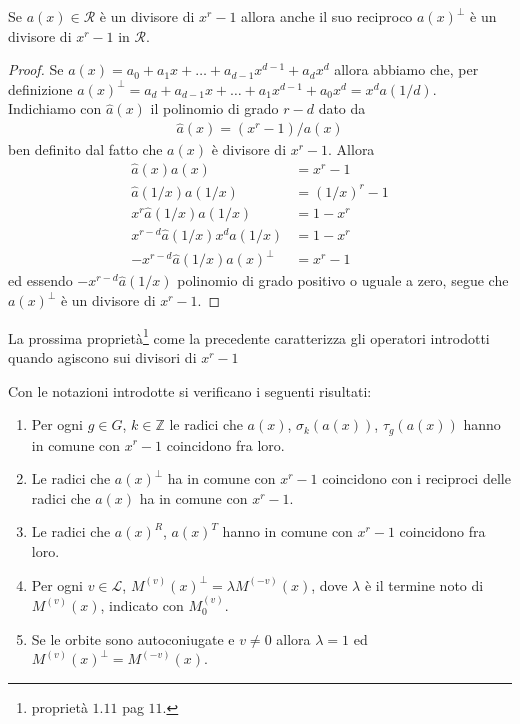 \begin{prop}\label{prop:reciprocoISdivisore}
   Se $a(x)\in \mathcal{R}$ è un divisore di $x^r - 1$ allora anche il suo reciproco $a(x)^{\perp}$ è un divisore di $x^r-1$ in $\mathcal{R}$.
\end{prop}
\begin{proof}
   Se $a(x) = a_{0} + a_{1}x + \dots + a_{d-1}x^{d-1} + a_{d}x^{d}$ allora abbiamo che, per definizione $a(x)^{\perp} = a_{d} + a_{d-1}x + \dots +  a_{1} x^{d-1} + a_{0}x^{d} = x^{d} a(1/d)$.\\
   Indichiamo con $\hat{a}(x)$ il polinomio di grado $r-d$ dato da
   \begin{align*}
      \hat{a}(x) = (x^r - 1)/a(x)
   \end{align*}
   ben definito dal fatto che $a(x)$ è divisore di $x^r - 1$. Allora
   \begin{align*}
       \hat{a}(x)a(x) &= x^r - 1 \\
       \hat{a}(1/x)a(1/x) &= (1/x)^r - 1 \\
       x^{r} \hat{a}(1/x)a(1/x) &= 1-x^r \\
       x^{r-d} \hat{a}(1/x)x^{d} a(1/x) &= 1-x^r \\
       -x^{r-d} \hat{a}(1/x) a(x)^{\perp} &= x^r - 1
   \end{align*}
   ed essendo $-x^{r-d} \hat{a}(1/x)$ polinomio di grado positivo o uguale a zero, segue che $a(x)^{\perp}$ è un divisore di $x^r - 1$.
\end{proof}
La prossima proprietà\footnote{\cite{cerruti} proprietà $1.11$ pag $11$.} come la precedente
caratterizza gli operatori introdotti quando agiscono sui divisori di $x^r - 1$
\begin{prop} \label{prop:multiplaOperatori}
    Con le notazioni introdotte si verificano i seguenti risultati:
   \begin{enumerate}
      \item \label{cap3:punto2} Per ogni $g \in G$, $k \in \mathbb{Z}$ le radici che $a(x)$, $\sigma_{k}(a(x))$, $\tau_{g}(a(x))$ hanno in comune con $x^r -1$ coincidono fra loro.
      \item \label{cap3:punto3} Le radici che $a(x)^{\perp}$ ha in comune con $x^r -1$ coincidono con i reciproci delle radici che $a(x)$ ha in comune con $x^r - 1$.
      \item \label{cap3:punto4} Le radici che $a(x)^{R}$, $a(x)^{T}$ hanno in comune con $x^r -1$ coincidono fra loro.
      \item \label{cap3:punto5} Per ogni $v\in \mathscr{L}$, $M^{(v)}(x)^{\perp} = \lambda M^{(-v)}(x)$, dove $\lambda$ è il termine noto di $M^{(v)}(x)$, indicato con $M_{0}^{(v)}$.
      \item \label{cap3:punto6} Se le orbite sono autoconiugate e $v\neq 0$ allora $\lambda = 1$ ed $M^{(v)}(x)^{\perp} = M^{(-v)}(x)$.
   \end{enumerate}
\end{prop}
